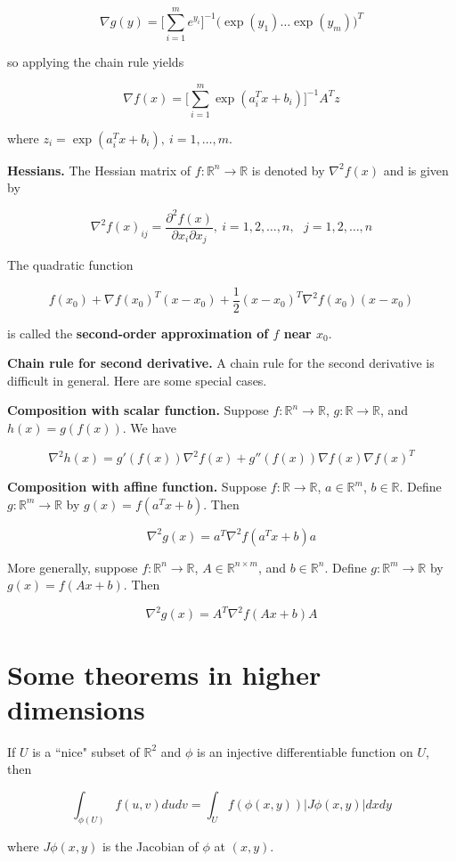 \[
\nabla g(y) = \bigg[ \sum_{i=1}^m e^{y_i} \bigg]^{-1} \big( \exp(y_1) \ldots \exp(y_m) \big) ^T
\]

so applying the chain rule yields

\[
\nabla f(x) =  \bigg[ \sum_{i=1}^m \exp( a_i^T x + b_i) \bigg]^{-1} A^T z
\]

where \(z_i = \exp(a_i^T x + b_i), \ i =1 , \ldots, m\).

\textbf{Hessians.} The Hessian matrix of \(f: \mathbb{R}^n \to \mathbb{R}\) is denoted by \(\nabla^2f(x)\) and is given by

\[
\nabla^2 f(x)_{ij} = \frac{\partial^2 f(x)}{\partial x_i \partial x_j} , \ i = 1, 2, \ldots, n, \ \ \ j = 1, 2, \ldots, n
\]

The quadratic function

\[
f(x_0) + \nabla f(x_0)^T (x - x_0) + \frac{1}{2} (x - x_0)^T \nabla^2 f(x_0) (x - x_0)
\]

is called the \textbf{second-order approximation of \(f\) near \(x_0\)}.

\textbf{Chain rule for second derivative.} A chain rule for the second derivative is difficult in general. Here are some special cases.

\textbf{Composition with scalar function.} Suppose \(f: \mathbb{R}^n \to \mathbb{R}\), \(g: \mathbb{R} \to \mathbb{R}\), and \(h(x) = g(f(x))\). We have

\[
\nabla^2 h(x) = g'(f(x)) \nabla^2 f(x) + g''(f(x)) \nabla f(x) \nabla f(x)^T
\]

\textbf{Composition with affine function.} Suppose  \(f: \mathbb{R} \to \mathbb{R}\), \(a \in \mathbb{R}^m\), \(b \in \mathbb{R}\). Define \(g: \mathbb{R}^m \to \mathbb{R}\) by \(g(x) = f(a^Tx + b)\). Then

\[
\nabla^2 g(x) = a^T \nabla^2 f(a^Tx + b) a
\]


More generally, suppose  \(f: \mathbb{R}^n \to \mathbb{R}\), \(A \in \mathbb{R}^{n \times m}\), and \(b \in \mathbb{R}^n\). Define \(g: \mathbb{R}^m \to \mathbb{R}\) by \(g(x) = f(Ax + b)\). Then

\[
\nabla^2 g(x) = A^T \nabla^2 f(Ax + b) A
\]

\section{Some theorems in higher dimensions}

\begin{proposition}If \(U\) is a ``nice" subset of \(\mathbb{R}^2\) and \(\phi\) is an injective differentiable function on \(U\), then 

\[
 \int_{\phi(U)} f(u,v) dudv = \int_U f(\phi(x,y)) | J \phi(x,y) | dx dy
\]

where \( J \phi(x,y)\) is the Jacobian of \(\phi\) at \((x,y)\).

\end{proposition}

